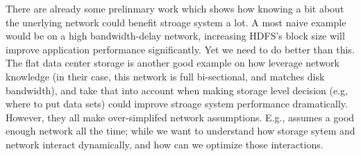 There are already some prelinmary work which shows how knowing a bit about the unerlying network could benefit stroage system a lot. A most naive example would be on a high bandwidth-delay network, increasing HDFS's block size will improve application performance significantly. 
Yet we need to do better than this. The flat data center storage \cite{flat-datacenter-storage} is another good example on how leverage network knowledge (in their case, this network is full bi-sectional, and matches disk bandwidth), and take that into account when making storage level decision (e.g, where to put data sets) could improve stroage system performance dramatically. However, they all make over-simplifed network assumptions. E.g., \cite{flat-datacenter-storage} assumes a good enough network all the time; while we want to understand how storage sytem and network interact dynamically, and how can we optimize those interactions.





